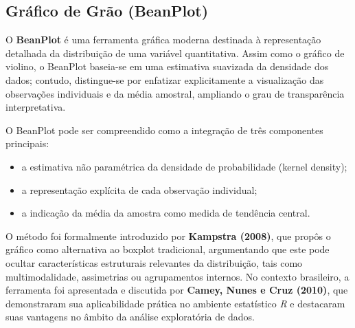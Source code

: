 

\newpage
\subsection{Gráfico de Grão (BeanPlot)}

O \textbf{BeanPlot} é uma ferramenta gráfica moderna destinada à representação detalhada da distribuição de uma variável quantitativa. Assim como o gráfico de violino, o BeanPlot baseia-se em uma estimativa suavizada da densidade dos dados; contudo, distingue-se por enfatizar explicitamente a visualização das observações individuais e da média amostral, ampliando o grau de transparência interpretativa. \vskip0.3cm

O BeanPlot pode ser compreendido como a integração de três componentes principais: \vskip0.3cm

\begin{itemize}
    \item a estimativa não paramétrica da densidade de probabilidade (kernel density);
    \item a representação explícita de cada observação individual;
    \item a indicação da média da amostra como medida de tendência central.
\end{itemize}

O método foi formalmente introduzido por \textbf{Kampstra (2008)}, que propôs o gráfico como alternativa ao boxplot tradicional, argumentando que este pode ocultar características estruturais relevantes da distribuição, tais como multimodalidade, assimetrias ou agrupamentos internos. No contexto brasileiro, a ferramenta foi apresentada e discutida por \textbf{Camey, Nunes e Cruz (2010)}, que demonstraram sua aplicabilidade prática no ambiente estatístico \textit{R} e destacaram suas vantagens no âmbito da análise exploratória de dados. \vskip0.3cm

